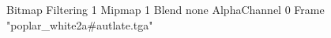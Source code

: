 {Bitmap
	{Filtering 1}
	{Mipmap 1}
	{Blend none}
	{AlphaChannel 0}
	{Frame "poplar_white2a#autlate.tga"}
}
